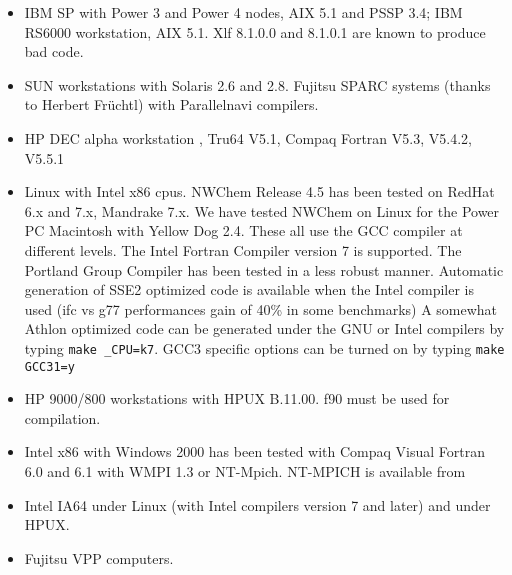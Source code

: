 \begin{itemize}
\item IBM SP with Power 3 and Power 4 nodes, AIX 5.1
    and PSSP 3.4; IBM RS6000 workstation, AIX 5.1. Xlf 8.1.0.0 and
    8.1.0.1 are known to produce bad code.
\item SUN workstations with Solaris 2.6 and 2.8. Fujitsu SPARC systems 
   (thanks to Herbert Fr\"uchtl) with Parallelnavi compilers.
\item HP DEC alpha workstation , Tru64 V5.1,
    Compaq Fortran V5.3, V5.4.2, V5.5.1
\item Linux with Intel x86 cpus. 
    NWChem Release 4.5 has been tested on RedHat 6.x and 7.x,
    Mandrake  7.x.
    We have tested NWChem on Linux for the Power PC Macintosh with
    Yellow Dog 2.4.
    These all use the GCC compiler at different levels. 
    The Intel Fortran Compiler version 7 is supported.
    The Portland Group Compiler has been tested in a less robust manner.
    Automatic generation of SSE2 optimized code is available when the 
    Intel compiler is used (ifc vs g77 performances gain of 40\% in
    some benchmarks)
    A somewhat Athlon optimized code can be generated under the GNU
    or Intel compilers by typing {\tt make \_CPU=k7}.
    GCC3 specific options can be turned on by typing {\tt make GCC31=y}
\item HP 9000/800 workstations with  HPUX B.11.00. f90 must be used for
    compilation.
\item Intel x86 with Windows 2000 has been tested with Compaq Visual Fortran
    6.0 and 6.1 with WMPI 1.3 or NT-Mpich.
    NT-MPICH is available from

\item Intel IA64 under Linux (with Intel compilers version 7 and later)
    and under HPUX.
\item Fujitsu VPP computers.


\end{itemize}

